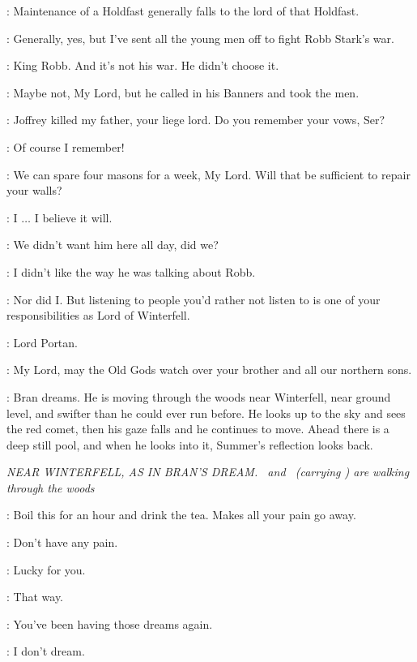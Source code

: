 \LUWIN: Maintenance of a Holdfast generally falls to the lord of that Holdfast.

\NORTHERNLORD: Generally, yes, but I've sent all the young men off to fight Robb Stark's war.

\BRAN: King Robb. And it's not his war. He didn't choose it.

\NORTHERNLORD: Maybe not, My Lord, but he called in his Banners and took the men.

\BRAN: Joffrey killed my father, your liege lord. Do you remember your vows, Ser?

\NORTHERNLORD: Of course I remember!

\LUWIN: We can spare four masons for a week, My Lord. Will that be sufficient to repair your walls?

\NORTHERNLORD: I $\ldots$ I believe it will.


\LUWIN: We didn't want him here all day, did we?

\BRAN: I didn't like the way he was talking about Robb.

\LUWIN: Nor did I. But listening to people you'd rather not listen to is one of your responsibilities as Lord of Winterfell.

\HERALD: Lord Portan.

\PORTAN: My Lord, may the Old Gods watch over your brother and all our northern sons.


\scene

\NARRATOR: Bran dreams.  He is moving through the woods near Winterfell, near ground level, and swifter than he could ever run before.  He looks up to the sky and sees the red comet, then his gaze falls and he continues to move.  Ahead there is a deep still pool, and when he looks into it, Summer's reflection looks back.

\scene

\textit{NEAR WINTERFELL, AS IN BRAN'S DREAM. \OSHA ~and \HODOR ~(carrying \BRAN) are walking through the woods}

\OSHA:  Boil this for an hour and drink the tea. Makes all your pain go away.

\BRAN: Don't have any pain.

\OSHA: Lucky for you.

\BRAN:  That way.

\OSHA: You've been having those dreams again.

\BRAN: I don't dream.

